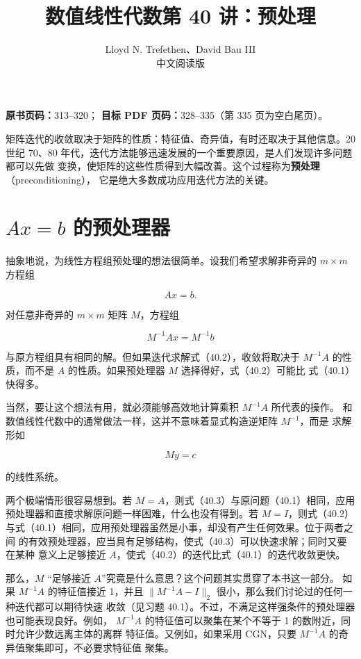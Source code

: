 \documentclass[UTF8,fontset=none,12pt]{ctexart}
\title{数值线性代数\quad 第 40 讲：预处理}
\author{Lloyd N. Trefethen、David Bau III\\中文阅读版}
\date{}
\begin{document}
\maketitle

\noindent
\textbf{原书页码：}313--320；\quad
\textbf{目标 PDF 页码：}328--335（第 335 页为空白尾页）。

矩阵迭代的收敛取决于矩阵的性质：特征值、奇异值，有时还取决于其他信息。20 世纪
70、80 年代，迭代方法能够迅速发展的一个重要原因，是人们发现许多问题都可以先做
变换，使矩阵的这些性质得到大幅改善。这个过程称为\textbf{预处理}（preconditioning），
它是绝大多数成功应用迭代方法的关键。

\section*{$Ax=b$ 的预处理器}

抽象地说，为线性方程组预处理的想法很简单。设我们希望求解非奇异的
$m\times m$ 方程组

\begin{equation}
Ax=b.
\tag{40.1}
\end{equation}

对任意非奇异的 $m\times m$ 矩阵 $M$，方程组

\begin{equation}
M^{-1}Ax=M^{-1}b
\tag{40.2}
\end{equation}

与原方程组具有相同的解。但如果迭代求解式（40.2），收敛将取决于 $M^{-1}A$
的性质，而不是 $A$ 的性质。如果预处理器 $M$ 选择得好，式（40.2）可能比
式（40.1）快得多。

当然，要让这个想法有用，就必须能够高效地计算乘积 $M^{-1}A$ 所代表的操作。
和数值线性代数中的通常做法一样，这并不意味着显式构造逆矩阵 $M^{-1}$，而是
求解形如

\begin{equation}
My=c
\tag{40.3}
\end{equation}

的线性系统。

两个极端情形很容易想到。若 $M=A$，则式（40.3）与原问题（40.1）相同，应用
预处理器和直接求解原问题一样困难，什么也没有得到。若 $M=I$，则式（40.2）
与式（40.1）相同，应用预处理器虽然是小事，却没有产生任何效果。位于两者之间
的有效预处理器，应当具有足够结构，使式（40.3）可以快速求解；同时又要在某种
意义上足够接近 $A$，使式（40.2）的迭代比式（40.1）的迭代收敛更快。

那么，$M$ “足够接近 $A$”究竟是什么意思？这个问题其实贯穿了本书这一部分。
如果 $M^{-1}A$ 的特征值接近 1，并且
$\lVert M^{-1}A-I\rVert_2$ 很小，那么我们讨论过的任何一种迭代都可以期待快速
收敛（见习题 40.1）。不过，不满足这样强条件的预处理器也可能表现良好。例如，
$M^{-1}A$ 的特征值可以聚集在某个不等于 1 的数附近，同时允许少数远离主体的离群
特征值。又例如，如果采用 CGN，只要 $M^{-1}A$ 的奇异值聚集即可，不必要求特征值
聚集。
\end{document}
